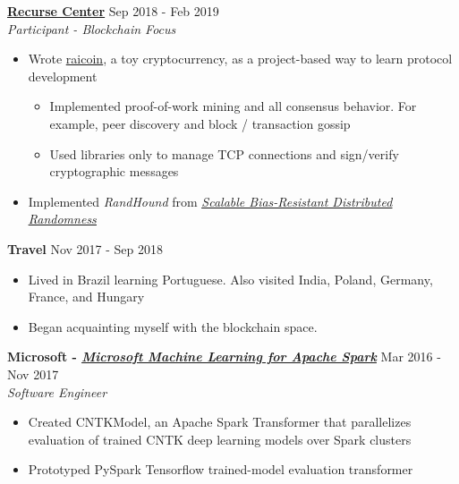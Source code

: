 \documentclass[overlapped]{res}
\begin{document}
\begin{resume}
    \href{https://www.recurse.com/}{\underline{\bf Recurse Center}} \hfill Sep 2018 - Feb 2019 \\
    {\em Participant\/ - Blockchain Focus}
    \begin{itemize} \itemsep-2pt
        \item
          Wrote \href{https://www.github.com/ratanrsur/raicoin}{\underline{raicoin}}, a toy cryptocurrency, as a project-based way to learn protocol development
        \begin{itemize} \itemsep-2pt
          \item
            Implemented proof-of-work mining and all consensus behavior. For example, peer discovery and block / transaction gossip
          \item Used libraries only to manage TCP connections and sign/verify cryptographic messages
        \end{itemize}

      \item Implemented {\em RandHound\/} from \href{Scalable Bias-Resistant Distributed Randomness}{\underline{{\em Scalable Bias-Resistant Distributed Randomness\/}}}
    \end{itemize}

    {\bf Travel} \hfill Nov 2017 - Sep 2018
    \begin{itemize} \itemsep-2pt
        \item
            Lived in Brazil learning Portuguese. Also visited India, Poland, Germany, France, and Hungary
        \item Began acquainting myself with the blockchain space.
    \end{itemize}


    {\bf Microsoft - \href{https://www.github.com/Azure/mmlspark}{\underline{\em Microsoft Machine Learning for Apache Spark}}} \hfill Mar 2016 - Nov 2017 \\
    {\em Software Engineer}
    \begin{itemize} \itemsep-2pt
        \item
          Created CNTKModel, an Apache Spark Transformer that parallelizes evaluation of trained CNTK deep learning models over Spark clusters
        \item
          Prototyped PySpark Tensorflow trained-model evaluation transformer
    \end{itemize}


\end{resume}
\end{document}
